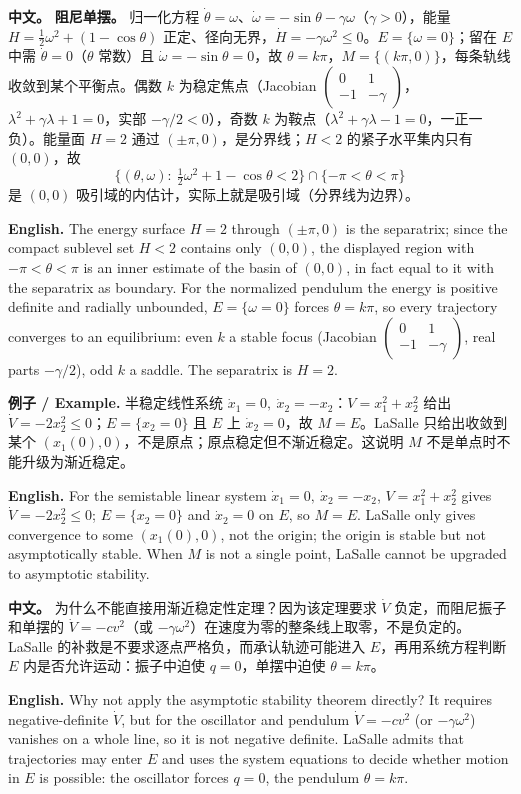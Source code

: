 \documentclass[UTF8,11pt,a4paper]{ctexart}
\newcommand{\EN}[1]{\par\noindent\textbf{English.} #1\par}
\newcommand{\EX}[2]{\par\noindent\textbf{例子 / Example.} #1\par\EN{#2}}
\newcommand{\APS}[2]{\par\noindent\textbf{中文。} #1\par\noindent\textbf{English.} #2\par}
\begin{document}
\APS{\textbf{阻尼单摆。} 归一化方程 $\dot\theta=\omega$、$\dot\omega=-\sin\theta-\gamma\omega$（$\gamma>0$），能量 $H=\frac12\omega^2+(1-\cos\theta)$ 正定、径向无界，$\dot H=-\gamma\omega^2\le0$。$E=\{\omega=0\}$；留在 $E$ 中需 $\dot\theta=0$（$\theta$ 常数）且 $\dot\omega=-\sin\theta=0$，故 $\theta=k\pi$，$M=\{(k\pi,0)\}$，每条轨线收敛到某个平衡点。偶数 $k$ 为稳定焦点（Jacobian $\begin{pmatrix}0&1\\-1&-\gamma\end{pmatrix}$，$\lambda^2+\gamma\lambda+1=0$，实部 $-\gamma/2<0$），奇数 $k$ 为鞍点（$\lambda^2+\gamma\lambda-1=0$，一正一负）。能量面 $H=2$ 通过 $(\pm\pi,0)$，是分界线；$H<2$ 的紧子水平集内只有 $(0,0)$，故
\[
\{(\theta,\omega):\ \tfrac12\omega^2+1-\cos\theta<2\}\cap\{-\pi<\theta<\pi\}
\]
是 $(0,0)$ 吸引域的内估计，实际上就是吸引域（分界线为边界）。}{The energy surface $H=2$ through $(\pm\pi,0)$ is the separatrix; since the compact sublevel set $H<2$ contains only $(0,0)$, the displayed region with $-\pi<\theta<\pi$ is an inner estimate of the basin of $(0,0)$, in fact equal to it with the separatrix as boundary. For the normalized pendulum the energy is positive definite and radially unbounded, $E=\{\omega=0\}$ forces $\theta=k\pi$, so every trajectory converges to an equilibrium: even $k$ a stable focus (Jacobian $\begin{pmatrix}0&1\\-1&-\gamma\end{pmatrix}$, real parts $-\gamma/2$), odd $k$ a saddle. The separatrix is $H=2$.}

\EX{半稳定线性系统 $\dot x_1=0,\ \dot x_2=-x_2$：$V=x_1^2+x_2^2$ 给出 $\dot V=-2x_2^2\le0$；$E=\{x_2=0\}$ 且 $E$ 上 $\dot x_2=0$，故 $M=E$。LaSalle 只给出收敛到某个 $(x_1(0),0)$，不是原点；原点稳定但不渐近稳定。这说明 $M$ 不是单点时不能升级为渐近稳定。}{For the semistable linear system $\dot x_1=0,\ \dot x_2=-x_2$, $V=x_1^2+x_2^2$ gives $\dot V=-2x_2^2\le0$; $E=\{x_2=0\}$ and $\dot x_2=0$ on $E$, so $M=E$. LaSalle only gives convergence to some $(x_1(0),0)$, not the origin; the origin is stable but not asymptotically stable. When $M$ is not a single point, LaSalle cannot be upgraded to asymptotic stability.}

\APS{为什么不能直接用渐近稳定性定理？因为该定理要求 $\dot V$ 负定，而阻尼振子和单摆的 $\dot V=-cv^2$（或 $-\gamma\omega^2$）在速度为零的整条线上取零，不是负定的。LaSalle 的补救是不要求逐点严格负，而承认轨迹可能进入 $E$，再用系统方程判断 $E$ 内是否允许运动：振子中迫使 $q=0$，单摆中迫使 $\theta=k\pi$。}{Why not apply the asymptotic stability theorem directly? It requires negative-definite $\dot V$, but for the oscillator and pendulum $\dot V=-cv^2$ (or $-\gamma\omega^2$) vanishes on a whole line, so it is not negative definite. LaSalle admits that trajectories may enter $E$ and uses the system equations to decide whether motion in $E$ is possible: the oscillator forces $q=0$, the pendulum $\theta=k\pi$.}
\end{document}
